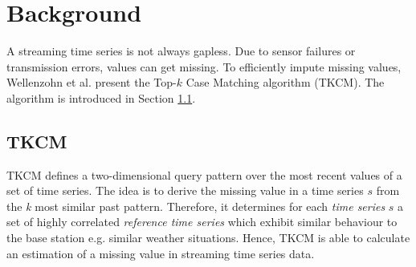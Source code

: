 \documentclass[abstracton,12pt]{scrreprt}
\begin{document}
\newtheorem{defn}{Definition}[section]
\newtheorem{exmp}{Example}[section]
\newcommand*{\argmin}{\operatornamewithlimits{argmin}\limits}

\chapter{Background}
\label{background}
A streaming time series is not always gapless. Due to sensor failures or transmission errors, values can get missing. To efficiently impute missing values, Wellenzohn et al.\cite{BScT} present the Top-$k$ Case Matching algorithm (TKCM). The algorithm is introduced in Section \ref{TKCM}.

\section{TKCM}
\label{TKCM}
TKCM defines a two-dimensional query pattern over the most recent values of a set of time series. 
The idea is to derive the missing value in a time series $s$ from the \emph{k} most similar past pattern. Therefore, it determines for each \emph{time series} $s$ a set of highly correlated \emph{reference time series} which exhibit similar behaviour to the base station e.g. similar weather situations. Hence, TKCM is able to calculate an estimation of a missing value in streaming time series data. 
\end{document}

